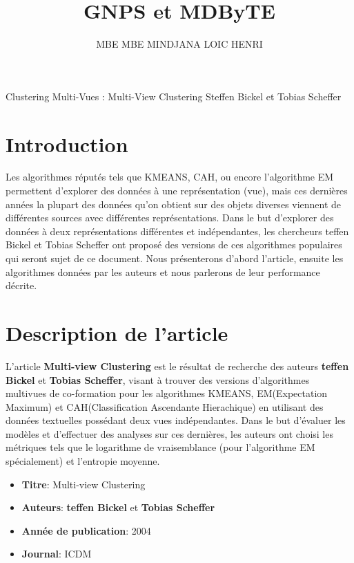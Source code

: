 \documentclass[12pt, french, latin.medieval, a4paper]{report}
\author{MBE MBE MINDJANA LOIC HENRI}
\title{GNPS et MDByTE}
\begin{document}
    
    \pagecouverture
    {Clustering Multi-Vues : Multi-View Clustering}
    {Steffen Bickel et Tobias Scheffer}
    \tableofcontents
    \vspace{20cm}
    
    \section{Introduction}
    Les algorithmes réputés tels que KMEANS, CAH, ou encore l'algorithme EM permettent d'explorer des données à une représentation (vue), mais ces dernières années la plupart des données qu'on obtient sur des objets diverses viennent de différentes sources avec différentes représentations. Dans le but d'explorer des données à deux représentations différentes et indépendantes, les chercheurs teffen Bickel et Tobias Scheffer ont proposé des versions de ces algorithmes populaires qui seront sujet de ce document. Nous présenterons d'abord l'article, ensuite les algorithmes données par les auteurs et nous parlerons de leur performance décrite.
    
    
    \section{Description de l'article}
         L'article \textbf{Multi-view Clustering} \cite{bickel2004multi} est le résultat de recherche des auteurs \textbf{teffen Bickel} et \textbf{Tobias Scheffer}, visant à trouver des versions d'algorithmes multivues de co-formation pour les algorithmes KMEANS, EM(Expectation Maximum) et CAH(Classification Ascendante Hierachique) en utilisant des données textuelles possédant deux vues indépendantes. Dans le but d'évaluer les modèles et d'effectuer des analyses sur ces dernières, les auteurs ont choisi les métriques tels que le logarithme de vraisemblance (pour l’algorithme EM spécialement) et l'entropie moyenne.
    
        \begin{itemize}
            \item \textbf{Titre}: Multi-view Clustering
            \item \textbf{Auteurs}: \textbf{teffen Bickel} et \textbf{Tobias Scheffer}
            \item \textbf{Année de publication}: 2004
            \item \textbf{Journal}: ICDM
        \end{itemize}
\end{document}
